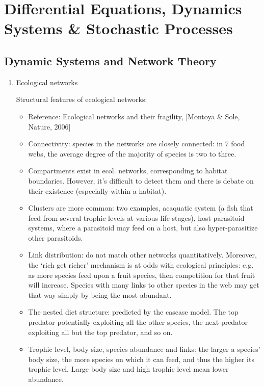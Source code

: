 \documentclass{report}
\begin{document}
\chapter{Differential Equations, Dynamics Systems \& Stochastic Processes}

\section{Dynamic Systems and Network Theory}
\begin{enumerate}

\item{Ecological networks}

Structural features of ecological networks:
\begin{itemize}
\item Reference: Ecological networks and their fragility, [Montoya \& Sole, Nature, 2006]

\item Connectivity: species in the networks are closely connected: in 7 food webs, the average degree of the majority of species is two to three. 

\item Compartments exist in ecol. networks, corresponding to habitat boundaries. However, it's difficult to detect them and there is debate on their existence (especially within a habitat).

\item Clusters are more common: two examples, acaquatic system (a fish that feed from several trophic levels at various life stages), host-parasitoid systems, where a parasitoid may feed on a host, but also hyper-parasitize other parasitoids. 

\item Link distribution: do not match other networks quantitatively. Moreover, the `rich get richer' mechanism is at odds with ecological principles: e.g. as more species feed upon a fruit species, then competition for that fruit will increase. Species with many links to other species in the web may get that way simply by being the most abundant.

\item The nested diet structure: predicted by the cascase model. The top predator potentially exploiting all the other species, the next predator exploiting all but the top predator, and so on.

\item Trophic level, body size, species abundance and links:  the larger a species' body size, the more species on which it can feed, and thus the higher its trophic level. Large body size and high trophic level mean lower abundance. 
\end{itemize}


\end{enumerate}
\end{document}
